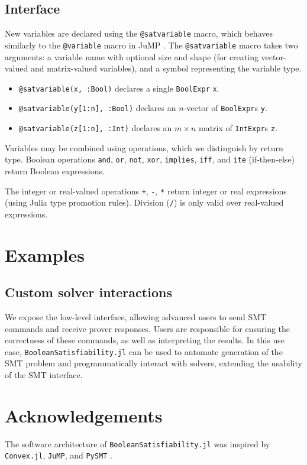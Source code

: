 \documentclass[conference]{IEEEtran}
\begin{document}
\subsection{Interface}
New variables are declared using the \verb|@satvariable| macro, which behaves similarly to the \verb|@variable| macro in JuMP \cite{Lubin2023}.
The \verb|@satvariable| macro takes two arguments: a variable name with optional size and shape (for creating vector-valued and matrix-valued variables), and a symbol representing the variable type.
\begin{itemize}
\item \verb|@satvariable(x, :Bool)| declares a single \verb|BoolExpr| \verb|x|.
\item \verb|@satvariable(y[1:n], :Bool)| declares an $n$-vector of \verb|BoolExpr|s \verb|y|.
\item \verb|@satvariable(z[1:n], :Int)| declares an $m\times n$ matrix of \verb|IntExpr|s \verb|z|.
\end{itemize}
  
Variables may be combined using operations, which we distinguish by return type.
Boolean operations \verb|and|, \verb|or|, \verb|not|, \verb|xor|, \verb|implies|, \verb|iff|, and \verb|ite| (if-then-else) return Boolean expressions.

The integer or real-valued operations \verb|+|, \verb|-|, \verb|*| return integer or real expressions (using Julia type promotion rules). Division (\verb|/|) is only valid over real-valued expressions.

\section{Examples}

\subsection*{Custom solver interactions}
We expose the low-level interface, allowing advanced users to send SMT commands and receive prover responses. Users are responsible for ensuring the correctness of these commands, as well as interpreting the results. In this use case, \verb|BooleanSatisfiability.jl| can be used to automate generation of the SMT problem and programmatically interact with solvers, extending the usability of the SMT interface.

\section{Acknowledgements}
The software architecture of \verb|BooleanSatisfiability.jl| was inspired by \verb|Convex.jl|, \verb|JuMP|, and \verb|PySMT| \cite{convexjl, Lubin2023, pysmt2015}.
\end{document}
